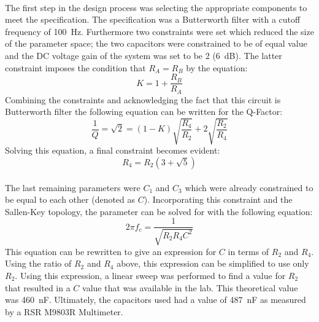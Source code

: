 \documentclass[justified]{tufte-handout}
\begin{document}
\paragraph{} The first step in the design process was selecting the appropriate
components to meet the specification. The specification was a Butterworth filter with a cutoff frequency of 100~Hz. Furthermore two
constraints were set which reduced the size of the parameter space; the two
capacitors were constrained to be of equal value and the DC voltage gain of the
system was set to be 2 (6~dB). The latter constraint imposes the condition that
$R_A = R_B$ by the equation:
\begin{equation}
K = 1 + \frac{R_B}{R_A}
\end{equation}
Combining the constraints and acknowledging the fact that this circuit is
Butterworth filter the following equation can be written for the Q-Factor:
\begin{equation}
\frac{1}{Q} = \sqrt{2} = (1-K)\sqrt{\frac{R_4}{R_2}} + 2\sqrt{\frac{R_2}{R_4}}
\end{equation}
Solving this equation, a final constraint becomes evident:
\begin{equation}
R_4 = R_2(3+\sqrt{5})
\end{equation}
\paragraph{} The last remaining parameters were $C_1$ and $C_3$ which were
already constrained to be equal to each other (denoted as $C$). Incorporating
this constraint and the Sallen-Key topology, the parameter can be solved for
with the following equation:
\begin{equation}
2\pi f_c = \frac{1}{\sqrt{R_2R_4C^2}}
\end{equation}
This equation can be rewritten to give an expression for $C$ in terms of $R_2$
and $R_4$. Using the ratio of $R_2$ and $R_4$ above, this expression can be
simplified to use only $R_2$. Using this expression, a linear sweep was
performed to find a value for $R_2$ that resulted in a $C$ value that was
available in the lab. This theoretical value was 460~nF. Ultimately, the
capacitors used had a value of 487~nF as measured by a RSR M9803R
Multimeter. 
\end{document}
